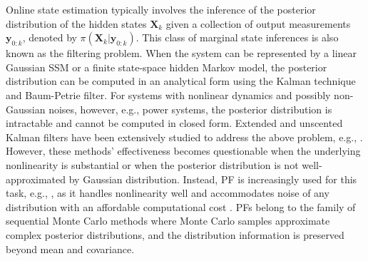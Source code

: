 Online state estimation typically involves the inference of the posterior distribution of the hidden states $\boldsymbol{X}_k$ given a collection of output measurements $\boldsymbol{y}_{0:k}$, denoted by $\pi(\boldsymbol{X}_k | \boldsymbol{y}_{0:k})$. This class of marginal state inferences is also known as the filtering problem. When the system can be represented by a linear Gaussian SSM or a finite state-space hidden Markov model, the posterior distribution can be computed in an analytical form using the Kalman technique and Baum-Petrie filter. For systems with nonlinear dynamics and possibly non-Gaussian noises, however, e.g., power systems, the posterior distribution is intractable and cannot be computed in closed form.
Extended and unscented Kalman filters have been extensively studied to address the above problem, e.g., \cite{Zhao2017,Wang2012}. However, these methods' effectiveness becomes questionable when the underlying nonlinearity is substantial or when the posterior distribution is not well-approximated by Gaussian distribution. Instead, PF is increasingly used for this task, e.g., \cite{Cui2015}, as it handles nonlinearity well and accommodates noise of any distribution with an affordable computational cost \cite{Kadirkamanathan2002,cappe2007overview}. PFs belong to the family of sequential Monte Carlo methods where Monte Carlo samples approximate complex posterior distributions, and the distribution information is preserved beyond mean and covariance. 

